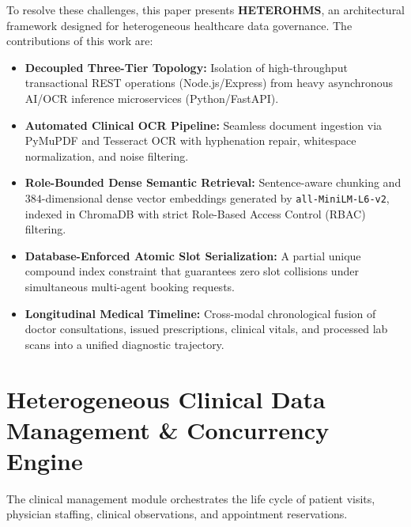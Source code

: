 \documentclass[conference]{IEEEtran}
\begin{document}
To resolve these challenges, this paper presents \textbf{HETEROHMS}, an architectural framework designed for heterogeneous healthcare data governance. The contributions of this work are:
\begin{itemize}
    \item \textbf{Decoupled Three-Tier Topology:} Isolation of high-throughput transactional REST operations (Node.js/Express) from heavy asynchronous AI/OCR inference microservices (Python/FastAPI).
    \item \textbf{Automated Clinical OCR Pipeline:} Seamless document ingestion via PyMuPDF and Tesseract OCR with hyphenation repair, whitespace normalization, and noise filtering.
    \item \textbf{Role-Bounded Dense Semantic Retrieval:} Sentence-aware chunking and $384$-dimensional dense vector embeddings generated by \texttt{all-MiniLM-L6-v2}, indexed in ChromaDB with strict Role-Based Access Control (RBAC) filtering.
    \item \textbf{Database-Enforced Atomic Slot Serialization:} A partial unique compound index constraint that guarantees zero slot collisions under simultaneous multi-agent booking requests.
    \item \textbf{Longitudinal Medical Timeline:} Cross-modal chronological fusion of doctor consultations, issued prescriptions, clinical vitals, and processed lab scans into a unified diagnostic trajectory.
\end{itemize}

\section{Heterogeneous Clinical Data Management \& Concurrency Engine}
The clinical management module orchestrates the life cycle of patient visits, physician staffing, clinical observations, and appointment reservations.
\end{document}
